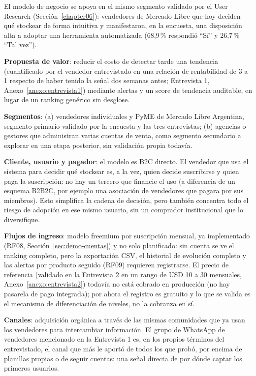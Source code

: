 El modelo de negocio se apoya en el mismo segmento validado por el User Research (Sección~\ref{chapter06}): vendedores de Mercado Libre que hoy deciden qué stockear de forma intuitiva y manifestaron, en la encuesta, una disposición alta a adoptar una herramienta automatizada (68,9\,\% respondió ``Sí'' y 26,7\,\% ``Tal vez'').

\textbf{Propuesta de valor}: reducir el costo de detectar tarde una tendencia (cuantificado por el vendedor entrevistado en una relación de rentabilidad de 3 a 1 respecto de haber tenido la señal dos semanas antes; Entrevista 1, Anexo~\ref{anexo:entrevista1}) mediante alertas y un score de tendencia auditable, en lugar de un ranking genérico sin desglose.

\textbf{Segmentos}: (a) vendedores individuales y PyME de Mercado Libre Argentina, segmento primario validado por la encuesta y las tres entrevistas; (b) agencias o gestores que administran varias cuentas de venta, como segmento secundario a explorar en una etapa posterior, sin validación propia todavía.

\textbf{Cliente, usuario y pagador}: el modelo es B2C directo. El vendedor que usa el sistema para decidir qué stockear es, a la vez, quien decide suscribirse y quien paga la suscripción: no hay un tercero que financie el uso (a diferencia de un esquema B2B2C, por ejemplo una asociación de vendedores que pagara por sus miembros). Esto simplifica la cadena de decisión, pero también concentra todo el riesgo de adopción en ese mismo usuario, sin un comprador institucional que lo diversifique.

\textbf{Flujos de ingreso}: modelo freemium por suscripción mensual, ya implementado (RF08, Sección~\ref{sec:demo-cuentas}) y no solo planificado: sin cuenta se ve el ranking completo, pero la exportación CSV, el historial de evolución completo y las alertas por producto seguido (RF09) requieren registrarse. El precio de referencia (validado en la Entrevista 2 en un rango de USD 10 a 30 mensuales, Anexo~\ref{anexo:entrevista2}) todavía no está cobrado en producción (no hay pasarela de pago integrada); por ahora el registro es gratuito y lo que se valida es el mecanismo de diferenciación de niveles, no la cobranza en sí.

\textbf{Canales}: adquisición orgánica a través de las mismas comunidades que ya usan los vendedores para intercambiar información. El grupo de WhatsApp de vendedores mencionado en la Entrevista 1 es, en los propios términos del entrevistado, el canal que más le aportó de todos los que probó, por encima de planillas propias o de seguir cuentas: una señal directa de por dónde captar los primeros usuarios.

